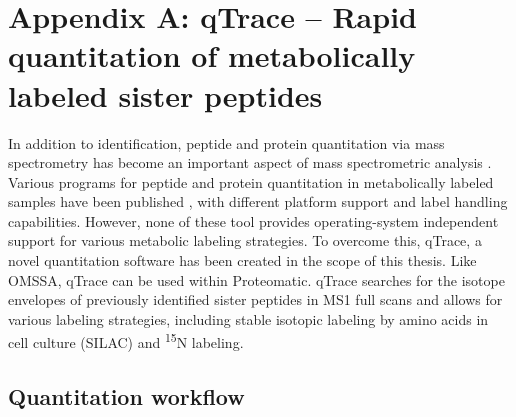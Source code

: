 \cleardoublepage
\chapter*{Appendix A: qTrace -- Rapid quantitation of metabolically labeled sister peptides}

In addition to identification, peptide and protein quantitation via mass 
spectrometry has become an important aspect of mass spectrometric analysis 
\citep{Kline2010, Schulze2010}. 
Various programs for peptide and protein quantitation in metabolically labeled 
samples have been published \citep{Han2001, Li2003, Saito2007, Park2008, 
Cox2008, Mortensen2010}, with different platform support and label handling 
capabilities. 
However, none of these tool provides operating-system independent support
for various metabolic labeling strategies.
To overcome this, qTrace, a novel quantitation software has been 
created in the scope of this thesis.
Like OMSSA, qTrace can be 
used within Proteomatic.
qTrace searches for the isotope envelopes of previously identified sister 
peptides in MS1 full scans and allows for various labeling strategies, 
including stable isotopic labeling by amino acids in cell culture (SILAC) 
and \textsuperscript{15}N labeling.

\section*{Quantitation workflow}

